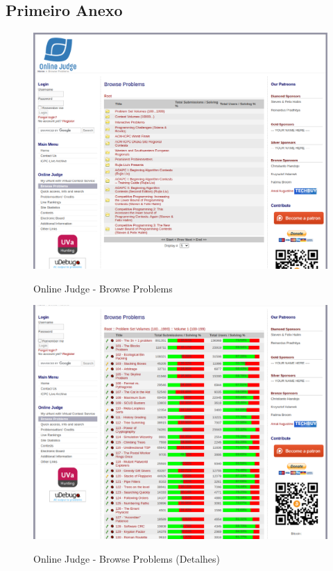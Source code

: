 \begin{anexosenv}

\partanexos
    
\chapter{Primeiro Anexo}

\begin{figure}[H]
    \centering
    \caption{Online Judge - Browse Problems}
    \includegraphics[keepaspectratio=true,scale=0.32]{figuras/online_judge_1.eps}
    \label{fig:online_judge_1}
\end{figure}

\begin{figure}[H]
    \centering
    \caption{Online Judge - Browse Problems (Detalhes)}
    \includegraphics[keepaspectratio=true,scale=0.32]{figuras/online_judge_2.eps}
    \label{fig:online_judge_2}
\end{figure}


\end{anexosenv}
